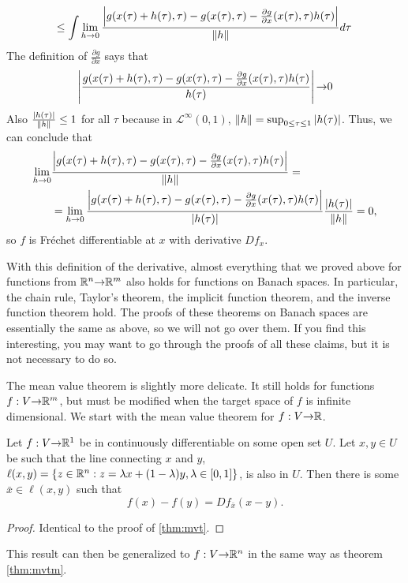 \begin{example*}
\begin{align*}
    \;\; & \leq  \int \lim_{h {\rightarrow} 0} \frac{ \left\vert { g(x(\tau) + h(\tau), \tau) -
        g(x(\tau),\tau) - \frac{\partial g}{\partial x}(x(\tau),\tau)
        h(\tau)} \right\vert } {\left\Vert {h} \right\Vert} d\tau 
  \end{align*}
  The definition of $\frac{\partial g}{\partial x}$ says that
  \[ \left\vert {\frac{ g(x(\tau) + h(\tau), \tau) -
      g(x(\tau),\tau) - \frac{\partial g}{\partial x}(x(\tau),\tau)
      h(\tau)}{h(\tau)}} \right\vert {\rightarrow} 0 \]
  Also $\frac{\left\vert {h(\tau)} \right\vert}{\left\Vert {h} \right\Vert} \leq 1$ for all $\tau$ because
  in $\mathcal{L}^\infty(0,1)$, $\left\Vert {h} \right\Vert = \sup_{0 \leq \tau \leq 1}
  \left\vert {h(\tau)} \right\vert$. Thus, we can conclude that
  \begin{align*}
    \lim_{h {\rightarrow} 0} & \frac{ \left\vert { g(x(\tau) + h(\tau), \tau) -
        g(x(\tau),\tau) - \frac{\partial g}{\partial x}(x(\tau),\tau)
        h(\tau)} \right\vert } {\left\Vert {h} \right\Vert}
    = \\ 
    & = \lim_{h {\rightarrow} 0} \frac{ \left\vert { g(x(\tau) + h(\tau), \tau) -
        g(x(\tau),\tau) - \frac{\partial g}{\partial x}(x(\tau),\tau)
        h(\tau)} \right\vert } {\left\vert {h(\tau)} \right\vert} \frac{\left\vert {h(\tau)} \right\vert} {\left\Vert {h} \right\Vert}  
    = 0,
  \end{align*}
  so $f$ is Fr\'{e}chet differentiable at $x$ with derivative $Df_x$. 
\end{example*}

With this definition of the derivative, almost everything that we
proved above for functions from $\mathbb{R}^n {\rightarrow} \mathbb{R}^m$ also holds for functions
on Banach spaces. In particular, the chain rule, Taylor's theorem, the
implicit function theorem, and the inverse function theorem hold. The
proofs of these theorems on Banach spaces are essentially the same as
above, so we will not go over them. If you find this interesting, you
may want to go through the proofs of all these claims, but it is not
necessary to do so. 

The mean value theorem is slightly more delicate. It still holds for
functions $f:V {\rightarrow} \mathbb{R}^m$, but must be modified when the target space
of $f$ is infinite dimensional. We start with the mean value theorem
for $f:V {\rightarrow} \mathbb{R}$. 
\begin{theorem}
  Let $f:V {\rightarrow} \mathbb{R}^1$ be in continuously differentiable on some open
  set $U$. Let $x, y \in U$ be such that the line connecting $x$ and
  $y$,
  $\ell(x,y) = \{z\in \mathbb{R}^n: z = \lambda x + (1-\lambda) y, \lambda \in
  [0,1]\}$, is also in $U$. Then there is some $\bar{x} \in \ell(x,y)$
  such that
  \[ f(x) - f(y) = Df_{\bar{x}} (x-y). \]
\end{theorem}
\begin{proof}
  Identical to the proof of \ref{thm:mvt}.
\end{proof}
This result can then be generalized to $f:V {\rightarrow} \mathbb{R}^n$ in the same way
as theorem \ref{thm:mvtm}. 

